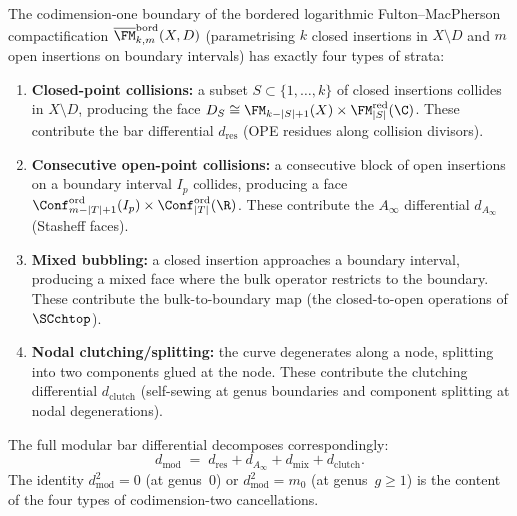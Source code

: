 \begin{proposition}
\label{prop:bordered-log-FM-strata}
The codimension-one boundary of the bordered logarithmic Fulton--MacPherson compactification $\overline{\FM}^{\mathrm{bord}}_{k,m}(X, D)$ (parametrising $k$ closed insertions in $X \setminus D$ and $m$ open insertions on boundary intervals) has exactly four types of strata:
\begin{enumerate}[label=\textup{(\roman*)}]
\item \textbf{Closed-point collisions:} a subset $S \subset \{1,\ldots,k\}$ of closed insertions collides in $X \setminus D$, producing the face $D_S \cong \FM_{k-|S|+1}(X) \times \FM_{|S|}^{\mathrm{red}}(\C)$. These contribute the bar differential $d_{\mathrm{res}}$ (OPE residues along collision divisors).
\item \textbf{Consecutive open-point collisions:} a consecutive block of open insertions on a boundary interval $I_p$ collides, producing a face $\Conf^{\mathrm{ord}}_{m-|T|+1}(I_p) \times \Conf^{\mathrm{ord}}_{|T|}(\R)$. These contribute the $A_\infty$ differential $d_{A_\infty}$ (Stasheff faces).
\item \textbf{Mixed bubbling:} a closed insertion approaches a boundary interval, producing a mixed face where the bulk operator restricts to the boundary. These contribute the bulk-to-boundary map (the closed-to-open operations of $\SCchtop$).
\item \textbf{Nodal clutching/splitting:} the curve degenerates along a node, splitting into two components glued at the node. These contribute the clutching differential $d_{\mathrm{clutch}}$ (self-sewing at genus boundaries and component splitting at nodal degenerations).
\end{enumerate}
The full modular bar differential decomposes correspondingly:
\[
d_{\mathrm{mod}} \;=\; d_{\mathrm{res}} + d_{A_\infty} + d_{\mathrm{mix}} + d_{\mathrm{clutch}}.
\]
The identity $d_{\mathrm{mod}}^2 = 0$ (at genus~$0$) or $d_{\mathrm{mod}}^2 = m_0$ (at genus~$g \geq 1$) is the content of the four types of codimension-two cancellations.
\end{proposition}

